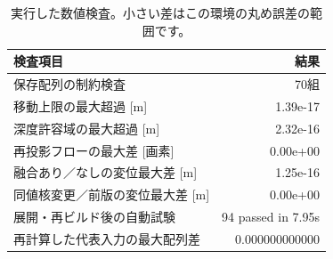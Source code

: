 \begin{table}[H]\centering
\small
\setlength{\tabcolsep}{4pt}
\caption{実行した数値検査。小さい差はこの環境の丸め誤差の範囲です。}
\begin{tabular}{p{.68\linewidth}r}
\toprule
検査項目 & 結果\\\midrule
保存配列の制約検査 & 70組\\
移動上限の最大超過 [m] & 1.39e-17\\
深度許容域の最大超過 [m] & 2.32e-16\\
再投影フローの最大差 [画素] & 0.00e+00\\
融合あり／なしの変位最大差 [m] & 1.25e-16\\
同値核変更／前版の変位最大差 [m] & 0.00e+00\\
展開・再ビルド後の自動試験 & 94 passed in 7.95s\\
再計算した代表入力の最大配列差 & 0.000000000000\\
\bottomrule
\end{tabular}
\end{table}
